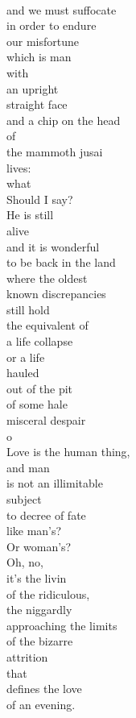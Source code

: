 \documentclass[smalldemyvopaper,11pt,twoside,onecolumn,openright,extrafontsizes]{memoir}
\begin{document}
\\and we must suffocate
\\in order to endure
\\our misfortune
\\which is man
\\with
\\an upright
\\straight face
\\and a chip on the head
\\of
\\the mammoth jusai
\\lives:
\\what
\\Should I say?
\\He is still
\\alive
\\and it is wonderful
\\to be back in the land
\\where the oldest
\\known discrepancies
\\still hold
\\the equivalent of
\\a life collapse
\\or a life
\\hauled
\\out of the pit
\\of some hale
\\misceral despair
\\o
\\Love is the human thing,
\\and man
\\is not an illimitable
\\subject
\\to decree of fate
\\like man's?
\\Or woman's?
\\Oh, no,
\\it's the livin
\\of the ridiculous,
\\the niggardly
\\approaching the limits
\\of the bizarre
\\attrition
\\that
\\defines the love
\\of an evening.
\end{document}
